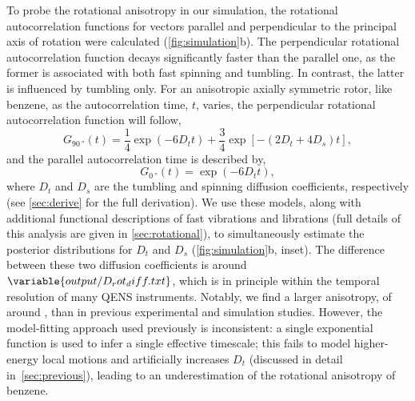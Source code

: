\documentclass[reprint,
               superscriptaddress,
               nobibnotes,
               amsmath,
               amssymb,
               aps,
               hidelinks, 
               pre]{revtex4-2}
\begin{document}
To probe the rotational anisotropy in our simulation, the rotational autocorrelation functions for vectors parallel and perpendicular to the principal axis of rotation were calculated (\cref{fig:simulation}b). 
The perpendicular rotational autocorrelation function decays significantly faster than the parallel one, as the former is associated with both fast spinning and tumbling. 
In contrast, the latter is influenced by tumbling only. 
For an anisotropic axially symmetric rotor, like benzene, as the autocorrelation time, $t$, varies, the perpendicular rotational autocorrelation function will follow, 
%
\begin{equation}
    G_{\qty{90}{\degree}}(t) = \frac{1}{4}\exp{\left(-6D_{t}t\right)} + \frac{3}{4}\exp{\left[-\left(2D_{t} + 4 D_{s}\right)t\right]}, 
    \label{eqn:exp}
\end{equation}
%
and the parallel autocorrelation time is described by, 
%
\begin{equation}
    G_{\qty{0}{\degree}}(t) = \exp{\left(-6D_tt\right)},
    \label{eqn:exp2}
\end{equation}
%
where $D_t$ and $D_s$ are the tumbling and spinning diffusion coefficients, respectively (see \ref{sec:derive} for the full derivation). 
We use these models, along with additional functional descriptions of fast vibrations and librations (full details of this analysis are given in \ref{sec:rotational}), to simultaneously estimate the posterior distributions for $D_t$ and $D_s$ (\cref{fig:simulation}b, inset).
The difference between these two diffusion coefficients is around $\variable{output/D_rot_diff.txt}$, which is in principle within the temporal resolution of many QENS instruments. 
Notably, we find a larger anisotropy, of around , than in previous experimental and simulation studies. 
However, the model-fitting approach used previously is inconsistent: a single exponential function is used to infer a single effective timescale; this fails to model higher-energy local motions and artificially increases $D_t$ (discussed in detail in~\ref{sec:previous}), leading to an underestimation of the rotational anisotropy of benzene. 
\end{document}
